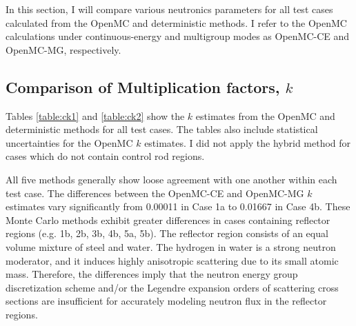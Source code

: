 In this section, I will compare various neutronics parameters for all test cases calculated from
the OpenMC and deterministic methods. I refer to the OpenMC calculations under continuous-energy
and multigroup modes as OpenMC-CE and OpenMC-MG, respectively.

\subsection{Comparison of Multiplication factors, $k$}

Tables \ref{table:ck1} and \ref{table:ck2} show the $k$ estimates from the OpenMC and deterministic
methods for all test cases. The tables also include statistical uncertainties for the OpenMC
$k$ estimates. I did not apply the hybrid method for cases which do not contain control rod
regions. 

All five methods generally show loose agreement with one another within each test case. The
differences between the OpenMC-CE and OpenMC-MG $k$ estimates vary significantly from 0.00011 in
Case 1a to 0.01667 in Case 4b. These Monte Carlo methods exhibit greater differences in cases
containing reflector regions (e.g. 1b, 2b, 3b, 4b, 5a, 5b). The reflector region consists of an
equal volume mixture of steel and water. The hydrogen in water is a strong neutron moderator, and
it induces highly anisotropic scattering due to its small atomic mass. Therefore, the differences
imply that the neutron energy group discretization scheme and/or the Legendre expansion orders of
scattering cross sections are insufficient for accurately modeling neutron flux in the reflector
regions.


